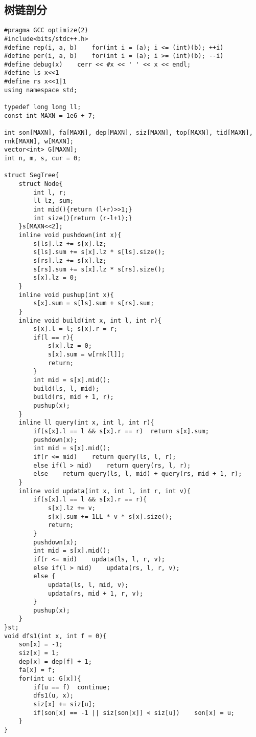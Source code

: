 \documentclass[twocolumn,a4]{article}
\begin{document}
\subsection{树链剖分}
\begin{lstlisting}
#pragma GCC optimize(2)
#include<bits/stdc++.h>
#define rep(i, a, b)    for(int i = (a); i <= (int)(b); ++i)
#define per(i, a, b)    for(int i = (a); i >= (int)(b); --i)
#define debug(x)    cerr << #x << ' ' << x << endl;
#define ls x<<1
#define rs x<<1|1
using namespace std;

typedef long long ll;
const int MAXN = 1e6 + 7;

int son[MAXN], fa[MAXN], dep[MAXN], siz[MAXN], top[MAXN], tid[MAXN], rnk[MAXN], w[MAXN];
vector<int> G[MAXN];
int n, m, s, cur = 0;

struct SegTree{
    struct Node{
        int l, r;
        ll lz, sum;
        int mid(){return (l+r)>>1;}
        int size(){return (r-l+1);}
    }s[MAXN<<2];
    inline void pushdown(int x){
        s[ls].lz += s[x].lz;
        s[ls].sum += s[x].lz * s[ls].size();
        s[rs].lz += s[x].lz;
        s[rs].sum += s[x].lz * s[rs].size();
        s[x].lz = 0;
    }
    inline void pushup(int x){
        s[x].sum = s[ls].sum + s[rs].sum;
    }
    inline void build(int x, int l, int r){
        s[x].l = l; s[x].r = r;
        if(l == r){
            s[x].lz = 0;
            s[x].sum = w[rnk[l]];
            return;
        }
        int mid = s[x].mid();
        build(ls, l, mid);
        build(rs, mid + 1, r);
        pushup(x);
    }
    inline ll query(int x, int l, int r){
        if(s[x].l == l && s[x].r == r)  return s[x].sum;
        pushdown(x);
        int mid = s[x].mid();
        if(r <= mid)    return query(ls, l, r);
        else if(l > mid)    return query(rs, l, r);
        else    return query(ls, l, mid) + query(rs, mid + 1, r);
    }
    inline void updata(int x, int l, int r, int v){
        if(s[x].l == l && s[x].r == r){
            s[x].lz += v;
            s[x].sum += 1LL * v * s[x].size();
            return;
        }
        pushdown(x);
        int mid = s[x].mid();
        if(r <= mid)    updata(ls, l, r, v);
        else if(l > mid)    updata(rs, l, r, v);
        else {
            updata(ls, l, mid, v);
            updata(rs, mid + 1, r, v);
        }
        pushup(x);
    }
}st;
void dfs1(int x, int f = 0){
    son[x] = -1;
    siz[x] = 1;
    dep[x] = dep[f] + 1;
    fa[x] = f;
    for(int u: G[x]){
        if(u == f)  continue;
        dfs1(u, x);
        siz[x] += siz[u];
        if(son[x] == -1 || siz[son[x]] < siz[u])    son[x] = u;
    }
}


\end{lstlisting}
\end{document}
